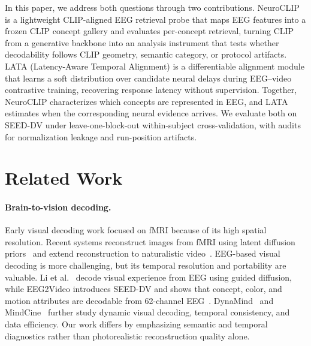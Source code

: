 \documentclass{article}
\begin{document}
In this paper, we address both questions through two contributions. NeuroCLIP is a lightweight CLIP-aligned EEG retrieval probe that maps EEG features into a frozen CLIP concept gallery and evaluates per-concept retrieval, turning CLIP from a generative backbone into an analysis instrument that tests whether decodability follows CLIP geometry, semantic category, or protocol artifacts. LATA (Latency-Aware Temporal Alignment) is a differentiable alignment module that learns a soft distribution over candidate neural delays during EEG–video contrastive training, recovering response latency without supervision. Together, NeuroCLIP characterizes which concepts are represented in EEG, and LATA estimates when the corresponding neural evidence arrives. We evaluate both on SEED-DV under leave-one-block-out within-subject cross-validation, with audits for normalization leakage and run-position artifacts. 

\section{Related Work}

\paragraph{Brain-to-vision decoding.}
Early visual decoding work focused on fMRI because of its high spatial
resolution. Recent systems reconstruct images from fMRI using latent diffusion
priors~\citep{takagi2023highres,ozcelik2023natural} and extend reconstruction to
naturalistic video~\citep{chen2023cinematic}. EEG-based visual decoding is more
challenging, but its temporal resolution and portability are valuable.
Li et al.~\citep{li2024visual} decode visual experience from EEG using guided
diffusion, while EEG2Video introduces SEED-DV and shows that concept, color, and
motion attributes are decodable from 62-channel EEG~\citep{liu2024eeg2video}.
DynaMind~\citep{dynamind2025} and MindCine~\citep{zhou2026mindcine} further
study dynamic visual decoding, temporal consistency, and data efficiency. Our
work differs by emphasizing semantic and temporal diagnostics rather than
photorealistic reconstruction quality alone.
\end{document}
